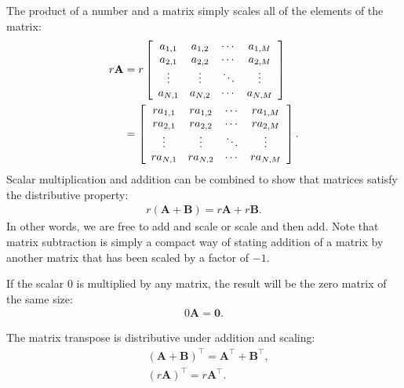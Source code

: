 The product of a number and a matrix simply scales all of the elements of the matrix:
\begin{align}
  r \mathbf{A} &= 
    r \left[ \begin{array}{c c c c} a_{1,1} & a_{1,2} & \cdots & a_{1,M} \\
  		  						  a_{2,1} & a_{2,2} & \cdots & a_{2,M} \\
		  						  \vdots  & \vdots  & \ddots & \vdots  \\
								  a_{N,1} & a_{N,2} & \cdots & a_{N,M} \\ \end{array} \right] \nonumber \\	
  &= \left[ \begin{array}{c c c c} r a_{1,1} & r a_{1,2} & \cdots & r a_{1,M} \\
  		  						   r a_{2,1} & r a_{2,2} & \cdots & r a_{2,M} \\
		  						   \vdots  & \vdots  & \ddots & \vdots  \\
								   r a_{N,1} & r a_{N,2} & \cdots & r a_{N,M} \\ \end{array} \right] .
\end{align}
Scalar multiplication and addition can be combined to show that matrices satisfy the distributive property:
\begin{align}
  r ( \mathbf{A} + \mathbf{B} ) = r \mathbf{A} + r \mathbf{B}.
\end{align}
In other words, we are free to add and scale or scale and then add. Note that matrix subtraction is simply a compact way of stating addition of a matrix by another matrix that has been scaled by a factor of $-1$.

If the scalar $0$ is multiplied by any matrix, the result will be the zero matrix of the same size:
\begin{align}
  0 \mathbf{A} = \mathbf{0} .
\end{align}

The matrix transpose is distributive under addition and scaling:
\begin{subequations}
\begin{align}
  &( \mathbf{A} + \mathbf{B} )^\top = \mathbf{A}^\top + \mathbf{B}^\top , \\
  &( r \mathbf{A} )^\top = r \mathbf{A}^\top.
\end{align}
\end{subequations}


